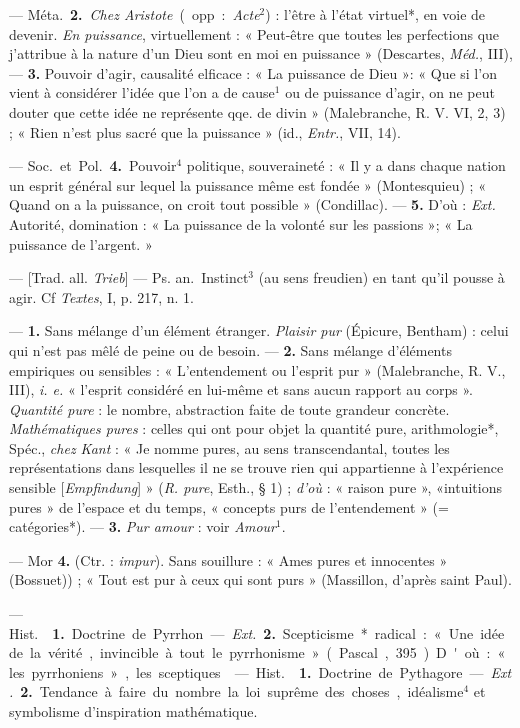 \begin{itemize}[leftmargin=1cm, label=, itemsep=1pt]
— \si{Méta.} {\bf 2.} {\it Chez Aristote} (opp. : {\it Acte}$^2$) : l'être à
l’état virtuel*, en voie de devenir. {\it En puissance}, virtuellement : «
Peut-être que toutes les perfections que j'attribue à la nature d'un Dieu
sont en moi en puissance » (Descartes, {\it Méd.}, III), — {\bf 3.} Pouvoir
d'agir, causalité elficace : « La puissance de Dieu »: « Que si l’on vient à
considérer l’idée que l'on a de cause$^1$ ou de puissance d'agir, on ne peut
douter que cette idée ne représente qqe. de divin » (Malebranche, R. V. VI,
2, 3) ; « Rien n'est plus sacré que la puissance » (id., {\it Entr.}, VII,
14).

— \si{Soc.} et \si{Pol.} {\bf 4.} Pouvoir$^4$ politique, souveraineté : « Il
y a dans chaque nation un esprit général sur lequel la puissance même est
fondée » (Montesquieu) ; « Quand on a la puissance, on croit tout possible
» (Condillac). — {\bf 5.} D'où : {\it Ext.} Autorité, domination : « La
puissance de la volonté sur les passions »; « La puissance de l'argent. »

 — [Trad. all. {\it Trieb}] — \si{Ps. an.} Instinct$^3$ (au sens
freudien) en tant qu'il pousse à agir. Cf {\it Textes}, I, p. 217, n. 1.

 — {\bf 1.} Sans mélange d’un élément étranger. {\it Plaisir pur}
(Épicure, Bentham) : celui qui n’est pas mêlé de peine ou de besoin. —
{\bf 2.} Sans mélange d’éléments empiriques ou sensibles : « L’entendement
ou l’esprit pur » (Malebranche, R. V., III), {\it i. e.} « l'esprit
considéré en lui-même et sans aucun rapport au corps ».
{\it Quantité pure} : le nombre, abstraction faite de toute grandeur
concrète. {\it Mathématiques pures} : celles qui ont pour objet la quantité
pure, arithmologie*, Spéc., {\it chez Kant} : « Je nomme pures, au sens
transcendantal, toutes les représentations dans lesquelles il ne se trouve
rien qui appartienne à l'expérience sensible [{\it Empfindung}] »
({\it R. pure}, Esth., § 1) ; {\it d’où} : « raison pure », «intuitions
pures » de l'espace et du temps, « concepts purs de l’entendement »
(= catégories*). — {\bf 3.} {\it Pur amour} : voir {\it Amour}$^1$.

— Mor {\bf 4.} (Ctr. : {\it impur}). Sans souillure : « Ames pures et
innocentes » (Bossuet)) ; « Tout est pur à ceux qui sont purs » (Massillon,
d’après saint Paul).

 — \si{Hist.}  {\bf 1.} Doctrine de Pyrrhon.
— {\it Ext.} {\bf 2.} Scepticisme* radical : « Une idée de la vérité,
invincible à tout le pyrrhonisme » (Pascal, 395). D'où : « les pyrrhoniens
», les sceptiques.

 — \si{Hist.}  {\bf 1.} Doctrine de
Pythagore. — {\it Ext.} {\bf 2.} Tendance à faire du nombre la loi suprême
des choses, idéalisme$^4$ et symbolisme d'inspiration mathématique.

	\end{itemize}
